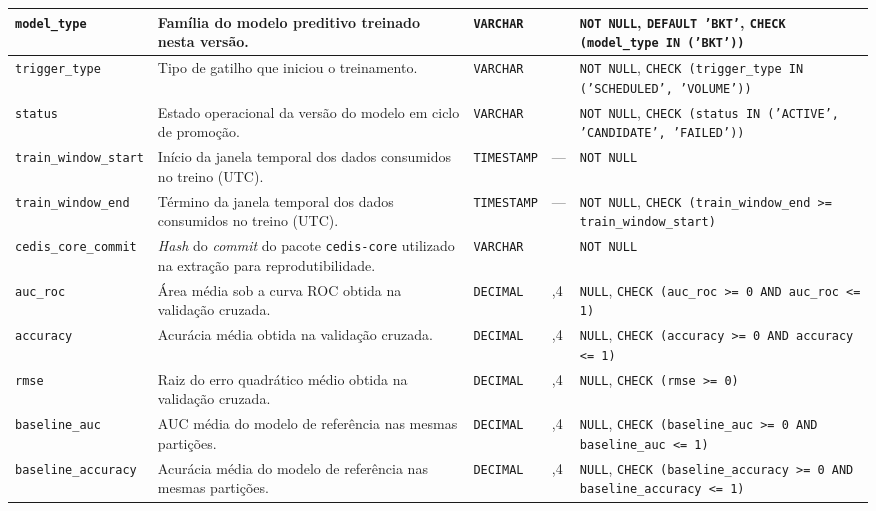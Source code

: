 \begin{anexosenv}
{\begin{longtable}{>{\raggedright\arraybackslash}p{3.0cm}>{\raggedright\arraybackslash}p{4.9cm}>{\raggedright\arraybackslash}p{1.75cm}>{\centering\arraybackslash}p{0.95cm}>{\raggedright\arraybackslash}p{3.7cm}}
\hline
\texttt{model\_\allowbreak type} & Família do modelo preditivo treinado nesta versão. & \texttt{VARCHAR} & 50 & \texttt{NOT NULL}, \texttt{DEFAULT 'BKT'}, \texttt{CHECK (model\_\allowbreak type IN ('BKT'))} \\
\hline
\texttt{trigger\_\allowbreak type} & Tipo de gatilho que iniciou o treinamento. & \texttt{VARCHAR} & 50 & \texttt{NOT NULL}, \texttt{CHECK (trigger\_\allowbreak type IN ('SCHEDULED', 'VOLUME'))} \\
\hline
\texttt{status} & Estado operacional da versão do modelo em ciclo de promoção. & \texttt{VARCHAR} & 50 & \texttt{NOT NULL}, \texttt{CHECK (status IN ('ACTIVE', 'CANDIDATE', 'FAILED'))} \\
\hline
\texttt{train\_\allowbreak window\_\allowbreak start} & Início da janela temporal dos dados consumidos no treino (UTC). & \texttt{TIMESTAMP} & --- & \texttt{NOT NULL} \\
\hline
\texttt{train\_\allowbreak window\_\allowbreak end} & Término da janela temporal dos dados consumidos no treino (UTC). & \texttt{TIMESTAMP} & --- & \texttt{NOT NULL}, \texttt{CHECK (train\_\allowbreak window\_\allowbreak end >= train\_\allowbreak window\_\allowbreak start)} \\
\hline
\texttt{cedis\_\allowbreak core\_\allowbreak commit} & \textit{Hash} do \textit{commit} do pacote \texttt{cedis-core} utilizado na extração para reprodutibilidade. & \texttt{VARCHAR} & 128 & \texttt{NOT NULL} \\
\hline
\texttt{auc\_\allowbreak roc} & Área média sob a curva ROC obtida na validação cruzada. & \texttt{DECIMAL} & 5,4 & \texttt{NULL}, \texttt{CHECK (auc\_\allowbreak roc >= 0 AND auc\_\allowbreak roc <= 1)} \\
\hline
\texttt{accuracy} & Acurácia média obtida na validação cruzada. & \texttt{DECIMAL} & 5,4 & \texttt{NULL}, \texttt{CHECK (accuracy >= 0 AND accuracy <= 1)} \\
\hline
\texttt{rmse} & Raiz do erro quadrático médio obtida na validação cruzada. & \texttt{DECIMAL} & 5,4 & \texttt{NULL}, \texttt{CHECK (rmse >= 0)} \\
\hline
\texttt{baseline\_\allowbreak auc} & AUC média do modelo de referência nas mesmas partições. & \texttt{DECIMAL} & 5,4 & \texttt{NULL}, \texttt{CHECK (baseline\_\allowbreak auc >= 0 AND baseline\_\allowbreak auc <= 1)} \\
\hline
\texttt{baseline\_\allowbreak accuracy} & Acurácia média do modelo de referência nas mesmas partições. & \texttt{DECIMAL} & 5,4 & \texttt{NULL}, \texttt{CHECK (baseline\_\allowbreak accuracy >= 0 AND baseline\_\allowbreak accuracy <= 1)} \\

\end{longtable}}
\end{anexosenv}
